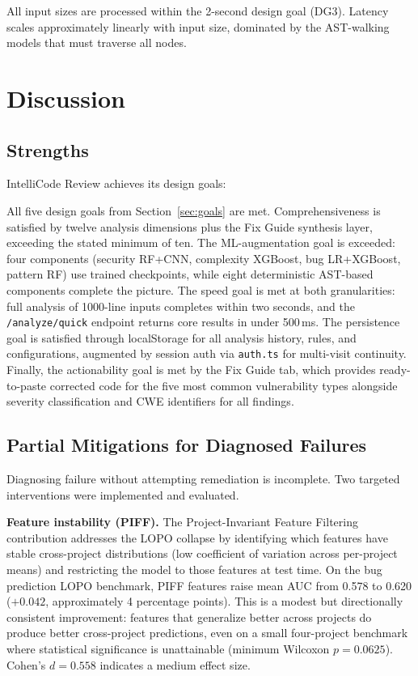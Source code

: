 \documentclass[12pt, oneside]{report}
\begin{document}
All input sizes are processed within the 2-second design goal (DG3). Latency scales
approximately linearly with input size, dominated by the AST-walking models that must
traverse all nodes.

\section{Discussion}
\label{sec:discussion}

\subsection{Strengths}

IntelliCode Review achieves its design goals:

All five design goals from Section~\ref{sec:goals} are met. Comprehensiveness is
satisfied by twelve analysis dimensions plus the Fix Guide synthesis layer, exceeding
the stated minimum of ten. The ML-augmentation goal is exceeded: four components
(security RF+CNN, complexity XGBoost, bug LR+XGBoost, pattern RF) use trained
checkpoints, while eight deterministic AST-based components complete the picture. The
speed goal is met at both granularities: full analysis of 1000-line inputs completes
within two seconds, and the \texttt{/analyze/quick} endpoint returns core results in
under 500\,ms. The persistence goal is satisfied through localStorage for all analysis
history, rules, and configurations, augmented by session auth via \texttt{auth.ts} for
multi-visit continuity. Finally, the actionability goal is met by the Fix Guide tab,
which provides ready-to-paste corrected code for the five most common vulnerability
types alongside severity classification and CWE identifiers for all findings.

\subsection{Partial Mitigations for Diagnosed Failures}
\label{ssec:mitigations}

Diagnosing failure without attempting remediation is incomplete. Two targeted
interventions were implemented and evaluated.

\textbf{Feature instability (PIFF).} The Project-Invariant Feature Filtering
contribution addresses the LOPO collapse by identifying which features have stable
cross-project distributions (low coefficient of variation across per-project means) and
restricting the model to those features at test time. On the bug prediction LOPO
benchmark, PIFF features raise mean AUC from 0.578 to 0.620 ($+0.042$, approximately
4 percentage points). This is a modest but directionally consistent improvement:
features that generalize better across projects do produce better cross-project
predictions, even on a small four-project benchmark where statistical significance
is unattainable (minimum Wilcoxon $p = 0.0625$). Cohen's $d = 0.558$ indicates a
medium effect size.
\end{document}
